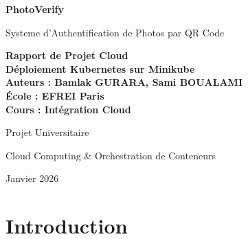 \documentclass[12pt,a4paper]{article}
\begin{document}
\begin{titlepage}
    \centering
    \vspace*{2cm}
    
    {\Huge\bfseries\color{primaryblue} PhotoVerify\par}
    \vspace{0.5cm}
    {\Large\color{accentgray} Systeme d'Authentification de Photos par QR Code\par}
    
    \vspace{2cm}
    
    \begin{tcolorbox}[colback=lightgray, colframe=primaryblue, width=0.8\textwidth, arc=3mm]
        \centering
        \large\bfseries Rapport de Projet Cloud\\[0.3cm]
        \normalsize Déploiement Kubernetes sur Minikube\\[0.5cm]
        \normalsize
        \textbf{Auteurs :} Bamlak GURARA, Sami BOUALAMI\\[0.3cm]
        \textbf{École :} EFREI Paris\\[0.3cm]
        \textbf{Cours :} Intégration Cloud
    \end{tcolorbox}
    
    \vspace{3cm}
    
    {\large Projet Universitaire\par}
    {\large Cloud Computing \& Orchestration de Conteneurs\par}
    
    \vfill
    
    {\large Janvier 2026\par}
\end{titlepage}

\tableofcontents
\newpage

\section{Introduction}
\end{document}
